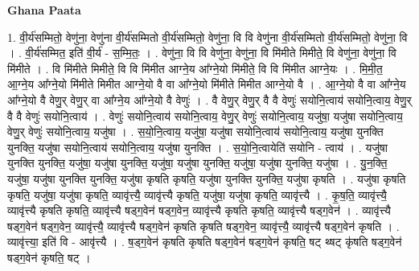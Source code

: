 \documentclass[17pt]{extarticle}
\begin{document}
\textbf{Ghana Paata } \newline

1. वी॒र्य॑सम्मितो॒ वेणु॑ना॒ वेणु॑ना वी॒र्य॑सम्मितो वी॒र्य॑सम्मितो॒ वेणु॑ना॒ वि वि वेणु॑ना वी॒र्य॑सम्मितो वी॒र्य॑सम्मितो॒ वेणु॑ना॒ वि । . वी॒र्य॑सम्मित॒ इति॑ वी॒र्य॑ - स॒म्मि॒तः॒ । . वेणु॑ना॒ वि वि वेणु॑ना॒ वेणु॑ना॒ वि मि॑मीते मिमीते॒ वि वेणु॑ना॒ वेणु॑ना॒ वि मि॑मीते । . वि मि॑मीते मिमीते॒ वि वि मि॑मीत आग्ने॒य आ᳚ग्ने॒यो मि॑मीते॒ वि वि मि॑मीत आग्ने॒यः । . मि॒मी॒त॒ आ॒ग्ने॒य आ᳚ग्ने॒यो मि॑मीते मिमीत आग्ने॒यो वै वा आ᳚ग्ने॒यो मि॑मीते मिमीत आग्ने॒यो वै । . आ॒ग्ने॒यो वै वा आ᳚ग्ने॒य आ᳚ग्ने॒यो वै वेणु॒र् वेणु॒र् वा आ᳚ग्ने॒य आ᳚ग्ने॒यो वै वेणुः॑ । . वै वेणु॒र् वेणु॒र् वै वै वेणुः॑ सयोनि॒त्वाय॑ सयोनि॒त्वाय॒ वेणु॒र् वै वै वेणुः॑ सयोनि॒त्वाय॑ । . वेणुः॑ सयोनि॒त्वाय॑ सयोनि॒त्वाय॒ वेणु॒र् वेणुः॑ सयोनि॒त्वाय॒ यजु॑षा॒ यजु॑षा सयोनि॒त्वाय॒ वेणु॒र् वेणुः॑ सयोनि॒त्वाय॒ यजु॑षा । . स॒यो॒नि॒त्वाय॒ यजु॑षा॒ यजु॑षा सयोनि॒त्वाय॑ सयोनि॒त्वाय॒ यजु॑षा युनक्ति युनक्ति॒ यजु॑षा सयोनि॒त्वाय॑ सयोनि॒त्वाय॒ यजु॑षा युनक्ति । . स॒यो॒नि॒त्वायेति॑ सयोनि - त्वाय॑ । . यजु॑षा युनक्ति युनक्ति॒ यजु॑षा॒ यजु॑षा युनक्ति॒ यजु॑षा॒ यजु॑षा युनक्ति॒ यजु॑षा॒ यजु॑षा युनक्ति॒ यजु॑षा । . यु॒न॒क्ति॒ यजु॑षा॒ यजु॑षा युनक्ति युनक्ति॒ यजु॑षा कृषति कृषति॒ यजु॑षा युनक्ति युनक्ति॒ यजु॑षा कृषति । . यजु॑षा कृषति कृषति॒ यजु॑षा॒ यजु॑षा कृषति॒ व्यावृ॑त्त्यै॒ व्यावृ॑त्त्यै कृषति॒ यजु॑षा॒ यजु॑षा कृषति॒ व्यावृ॑त्त्यै । . कृ॒ष॒ति॒ व्यावृ॑त्त्यै॒ व्यावृ॑त्त्यै कृषति कृषति॒ व्यावृ॑त्त्यै षड्ग॒वेन॑ षड्ग॒वेन॒ व्यावृ॑त्त्यै कृषति कृषति॒ व्यावृ॑त्त्यै षड्ग॒वेन॑ । . व्यावृ॑त्त्यै षड्ग॒वेन॑ षड्ग॒वेन॒ व्यावृ॑त्त्यै॒ व्यावृ॑त्त्यै षड्ग॒वेन॑ कृषति कृषति षड्ग॒वेन॒ व्यावृ॑त्त्यै॒ व्यावृ॑त्त्यै षड्ग॒वेन॑ कृषति । . व्यावृ॑त्त्या॒ इति॑ वि - आवृ॑त्त्यै । . ष॒ड्ग॒वेन॑ कृषति कृषति षड्ग॒वेन॑ षड्ग॒वेन॑ कृषति॒ षट् थ्षट् कृ॑षति षड्ग॒वेन॑ षड्ग॒वेन॑ कृषति॒ षट् । \newline
\end{document}
